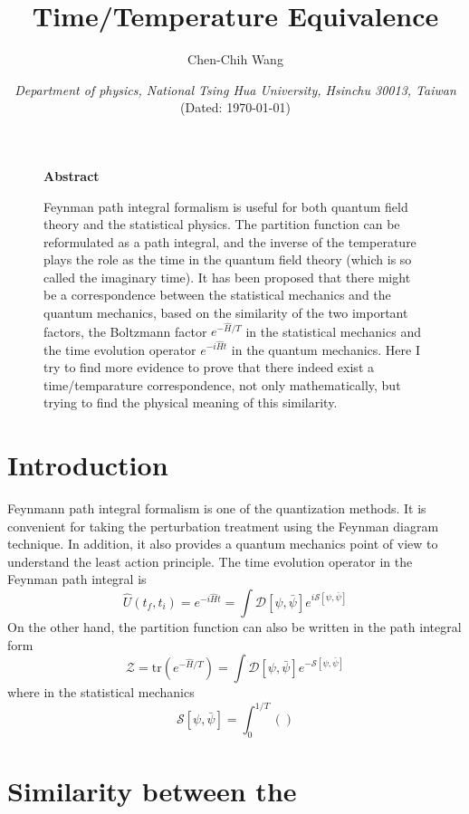 \documentclass[12font]{article}
\title{\textbf{ Time/Temperature Equivalence }}
\author{Chen-Chih Wang  }
\date{\textit{Department of physics, National Tsing Hua University, Hsinchu 30013, Taiwan} \\ (Dated: \today)}
\newcommand{\lr}[1]{\left(  #1  \right)}
\newcommand{\mrm}[1]{\mathrm{#1}}
\begin{document}
\setlength{\baselineskip}{20pt}

\maketitle
\begin{figure}[H] %
  \centering
  \begin{minipage}[t]{0.8\textwidth}
  \small{
  \centering
     \textbf{Abstract} 
     
     Feynman path integral formalism is useful for both quantum field theory and the statistical physics. The partition function can be reformulated as a path integral, and the inverse of the temperature plays the role as the time in the quantum field theory (which is so called the imaginary time). It has been proposed that there might be a correspondence between the statistical mechanics and the quantum mechanics, based on the similarity of the two important factors, the Boltzmann factor $e^{-\hat{H}/T}$ in the statistical mechanics and the time evolution operator $e^{-i\hat{H}t}$ in the quantum mechanics. Here I try to find more evidence to prove that there indeed exist a time/temparature correspondence, not only mathematically, but trying to find the physical meaning of this similarity.
  }
  \end{minipage}
\end{figure}

\section{Introduction}
Feynmann path integral formalism is one of the quantization methods. It is convenient for taking the perturbation treatment using the Feynman diagram technique. In addition, it also provides a quantum mechanics point of view to understand the least action principle. The time evolution operator in the Feynman path integral is
\[\hat{U}(t_f,t_i) = e^{-i\hat{H}t} = \int \mathcal{D}[\psi,\bar{\psi}]e^{i\mathcal{S}[\psi,\bar{\psi}]} \]
On the other hand, the partition function can also be written in the path integral form
\[\mathcal{Z} = \mrm{tr}\lr{e^{-\hat{H}/T}} = \int \mathcal{D}[\psi,\bar{\psi}]e^{-\mathcal{S}[\psi,\bar{\psi}]}\]
where in the statistical mechanics
\[
\mathcal{S}[\psi,\bar{\psi}] = \int_{0}^{1/T}\lr{}
\]

\section{Similarity between the }




\end{document}
